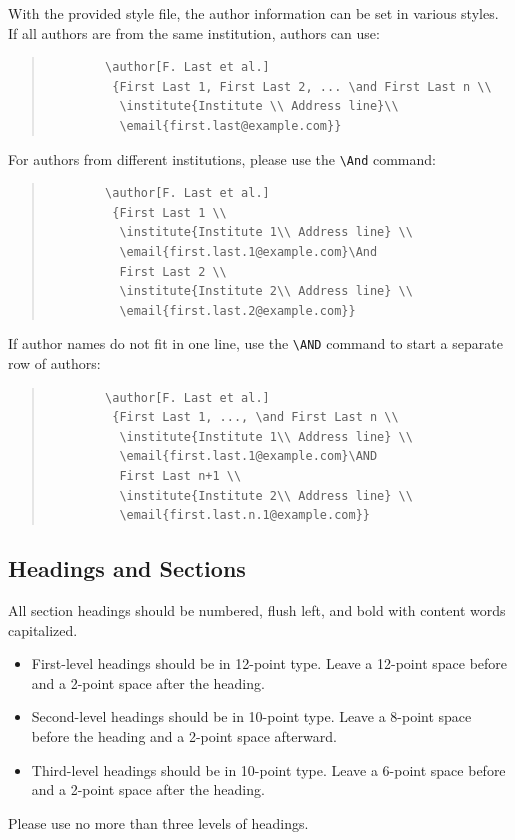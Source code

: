 \documentclass{article}
\begin{document}
With the provided style file, the author information can be set in various styles.
If all authors are from the same institution, authors can use:
\begin{quote}
	\begin{verbatim}
		\author[F. Last et al.]
		 {First Last 1, First Last 2, ... \and First Last n \\
		  \institute{Institute \\ Address line}\\
		  \email{first.last@example.com}}
	\end{verbatim}
\end{quote}
For authors from different institutions, please use the \verb+\And+ command:
\begin{quote}
	\begin{verbatim}
		\author[F. Last et al.]
		 {First Last 1 \\
		  \institute{Institute 1\\ Address line} \\
		  \email{first.last.1@example.com}\And
		  First Last 2 \\
		  \institute{Institute 2\\ Address line} \\
		  \email{first.last.2@example.com}}
	\end{verbatim}
\end{quote}
If author names do not fit in one line, use the \verb+\AND+ command to start a separate row of authors:
\begin{quote}
	\begin{verbatim}
		\author[F. Last et al.]
		 {First Last 1, ..., \and First Last n \\
		  \institute{Institute 1\\ Address line} \\
		  \email{first.last.1@example.com}\AND
		  First Last n+1 \\
		  \institute{Institute 2\\ Address line} \\
		  \email{first.last.n.1@example.com}}
	\end{verbatim}
\end{quote}



\subsection{Headings and Sections}
All section headings should be numbered, flush left, and bold with content words capitalized.
\begin{itemize}
	\item First-level headings should be in 12-point type. Leave a 12-point space before and a 2-point space after the heading.
	\item Second-level headings should be in 10-point type. Leave a 8-point space before the heading and a 2-point space afterward.
	\item Third-level headings should be in 10-point type. Leave a 6-point space before and a 2-point space after the heading.
\end{itemize}
Please use no more than three levels of headings.
\end{document}
